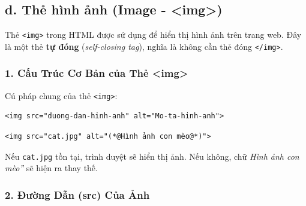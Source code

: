 \documentclass[11pt,oneside]{book}
\newcommand{\thd}[1]{\textcolor{white}{\textbf{\strut #1}}}
\newcommand{\codeinline}[1]{\textcolor{accentOrange}{\texttt{#1}}}
\begin{document}
\subsection{d. Thẻ hình ảnh (Image - <img>)}

Thẻ \codeinline{<img>} trong HTML được sử dụng để hiển thị hình ảnh trên trang web. Đây là một thẻ \textbf{tự đóng} (\textit{self-closing tag}), nghĩa là không cần thẻ đóng \codeinline{</img>}.

\subsubsection{1. Cấu Trúc Cơ Bản của Thẻ <img>}

Cú pháp chung của thẻ \codeinline{<img>}:

\begin{codeWindow}
\begin{lstlisting}[language=HTML5]
<img src="duong-dan-hinh-anh" alt="Mo-ta-hinh-anh">
\end{lstlisting}
\end{codeWindow}

\begin{prettyTableBox}
\end{prettyTableBox}

\begin{codeWindow}
\begin{lstlisting}[language=HTML5]
<img src="cat.jpg" alt="(*@Hình ảnh con mèo@*)">
\end{lstlisting}
\end{codeWindow}

\begin{noteBox}
Nếu \codeinline{cat.jpg} tồn tại, trình duyệt sẽ hiển thị ảnh. Nếu không, chữ \textit{\codeinline{}Hình ảnh con mèo''} sẽ hiện ra thay thế.
\end{noteBox}

\subsubsection{2. Đường Dẫn (src) Của Ảnh}
\end{document}
